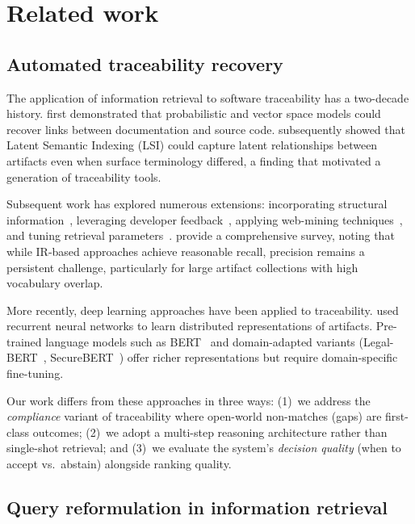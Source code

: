 \documentclass[a4paper,fleqn]{cas-sc}
\begin{document}
\section{Related work}
\label{sec:related}

\subsection{Automated traceability recovery}

The application of information retrieval to software traceability has a two-decade history.
\citet{Antoniol2002} first demonstrated that probabilistic and vector space models could recover links between documentation and source code.
\citet{MarcusMaletic2003} subsequently showed that Latent Semantic Indexing (LSI) could capture latent relationships between artifacts even when surface terminology differed, a finding that motivated a generation of traceability tools.

Subsequent work has explored numerous extensions: incorporating structural information~\citep{McMillan2009}, leveraging developer feedback~\citep{Cuddeback2010}, applying web-mining techniques~\citep{Ali2013}, and tuning retrieval parameters~\citep{Oliveto2010}.
\citet{Borg2014} provide a comprehensive survey, noting that while IR-based approaches achieve reasonable recall, precision remains a persistent challenge, particularly for large artifact collections with high vocabulary overlap.

More recently, deep learning approaches have been applied to traceability.
\citet{Guo2017} used recurrent neural networks to learn distributed representations of artifacts.
Pre-trained language models such as BERT~\citep{Devlin2019} and domain-adapted variants (Legal-BERT~\citep{Chalkidis2020}, SecureBERT~\citep{Aghaei2022}) offer richer representations but require domain-specific fine-tuning.

Our work differs from these approaches in three ways: (1)~we address the \emph{compliance} variant of traceability where open-world non-matches (gaps) are first-class outcomes; (2)~we adopt a multi-step reasoning architecture rather than single-shot retrieval; and (3)~we evaluate the system's \emph{decision quality} (when to accept vs.\ abstain) alongside ranking quality.

\subsection{Query reformulation in information retrieval}
\end{document}

